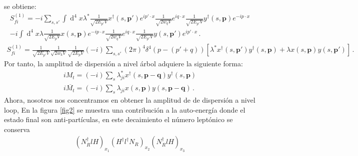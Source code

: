 se obtiene:
\begin{multline}
S_{fi}^{(1)}=-i\displaystyle\sum_{s,s'}\int \operatorname{d}^{4}x \lambda^* \frac{1}{\sqrt{2E_{p'} V}}x^{\dagger}(s,\mathbf{p'})e^{ip'\cdot x}\frac{1}{\sqrt{2w_{q}V}}e^{iq\cdot x}\frac{1}{\sqrt{2E_{p'}V}}y^{\dagger}(s,\mathbf{p})e^{-i p\cdot x}\\
-i\int \operatorname{d}^{4}x \lambda \frac{1}{\sqrt{2E_p V}}x(s,\mathbf{p})e^{-ip\cdot x}\frac{1}{\sqrt{2w_{q}V}}e^{iq\cdot x}\frac{1}{\sqrt{2E_{p'}V}}y(s,\mathbf{p'})e^{i p'\cdot x}\,.
\end{multline}
\begin{align}
S_{fi}^{(1)}=\frac{1}{\sqrt{2E_{p'}V}}\frac{1}{\sqrt{2w_{k}V}}\frac{1}{\sqrt{2E_p V}}(-i)\displaystyle\sum_{s,s'}(2\pi)^4\delta^4({p-(p'+q)})[\lambda^* x^{\dagger}(s,\mathbf{p'})y^{\dagger}(s,\mathbf{p})+\lambda x(s,\mathbf{p})y(s,\mathbf{p'})]\, .
\end{align}
Por tanto, la amplitud de dispersión a nivel árbol adquiere la siguiente forma:
\begin{align}
iM_{t}=(-i)\displaystyle\sum_{s}\lambda_{ji}^* x^{\dagger}(s,\mathbf{p-q})y^{\dagger}(s,\mathbf{p})\\ \nonumber
i\overline{M_{t}}=(-i)\displaystyle\sum_{s}\lambda_{ji} x(s,\mathbf{p})y(s,\mathbf{p-q})\, .
\end{align}
Ahora, nosotros nos concentramos en obtener la amplitud de de dispersión a nivel loop,
En la figura \ref{fig2} se muestra una contribución a la auto-energía donde el estado final son anti-partículas, en este decaimiento el número leptónico  se conserva
\begin{align}
(N_{R}^{\dagger}lH)_{x_{1}}
(H^{\dagger}l^{\dagger} N_{R})_{x_{2}}
(N_{R}^{\dagger}lH)_{x_{3}}
\end{align}
